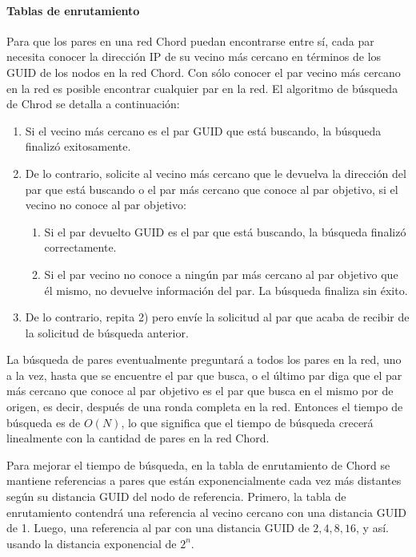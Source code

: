  
 \paragraph{Tablas de enrutamiento}
 
 Para que los pares en una red Chord puedan encontrarse entre sí, cada par necesita conocer  la dirección IP   de su vecino más cercano en términos de los  GUID de los nodos en la red Chord.  
Con sólo conocer el par vecino más cercano en la red es posible encontrar cualquier par en la red. El algoritmo de búsqueda de Chrod  se detalla a continuaci\'on:
 

\begin{enumerate}
	\item  Si el vecino más cercano es el par GUID que está buscando, la búsqueda finalizó exitosamente.
	
	\item De lo contrario, solicite al vecino más cercano que le devuelva la dirección del par que está buscando o el par más cercano que conoce al par objetivo, si el vecino no conoce al par objetivo:
	\begin{enumerate}
		\item Si el par devuelto GUID es el par que está buscando, la búsqueda finalizó correctamente.
		
		\item Si el par vecino no conoce a ningún par más cercano al par objetivo que él mismo, no devuelve información del par. La búsqueda finaliza sin éxito.
	\end{enumerate}	
	
	\item De lo contrario, repita 2) pero envíe la solicitud al par que acaba de recibir de la solicitud de búsqueda anterior.
	
\end{enumerate}

	
La búsqueda de pares eventualmente preguntará a todos los pares en la red, uno a la vez, hasta que se encuentre el par que busca, o el último par diga que el par más cercano que conoce al par objetivo es el par que busca en el mismo por de origen, es decir, después de una ronda completa en la red.
Entonces el tiempo de búsqueda es de $O(N)$, lo que significa que el tiempo de búsqueda crecerá linealmente con la cantidad de pares en la red Chord.  

Para mejorar el tiempo de búsqueda, en la tabla de enrutamiento de Chord se mantiene referencias a pares que están exponencialmente cada vez más distantes según su distancia GUID del nodo de referencia. Primero, la tabla de enrutamiento contendrá una referencia al vecino cercano  con una distancia GUID de 1. Luego, una referencia al par con una distancia GUID de $2,  4,  8,  16$, y as\'i. usando la distancia exponencial de $2^{n}$.

